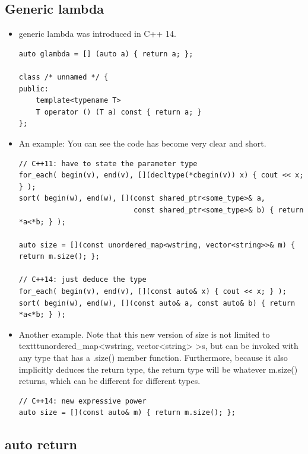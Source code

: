 \documentclass[a4paper,11pt,twoside]{book}
\begin{document}
\subsection{Generic lambda}
	
\begin{itemize}
		\item generic lambda was introduced in C++ 14. 
\begin{lstlisting}
auto glambda = [] (auto a) { return a; };

class /* unnamed */ {
public:
    template<typename T>
    T operator () (T a) const { return a; }
};
\end{lstlisting}

		\item An example: You can see the code has become very clear and short.

\begin{lstlisting}
// C++11: have to state the parameter type
for_each( begin(v), end(v), [](decltype(*cbegin(v)) x) { cout << x; } );
sort( begin(w), end(w), [](const shared_ptr<some_type>& a, 
                           const shared_ptr<some_type>& b) { return *a<*b; } );

auto size = [](const unordered_map<wstring, vector<string>>& m) { return m.size(); };

// C++14: just deduce the type
for_each( begin(v), end(v), [](const auto& x) { cout << x; } );
sort( begin(w), end(w), [](const auto& a, const auto& b) { return *a<*b; } );
\end{lstlisting}

		\item Another example.  Note that this new version of size is not limited to \/texttt{unordered\_map<wstring, vector<string> >s}, but can be invoked with any type that has a .size() member function. Furthermore, because it also implicitly deduces the return type, the return type will be whatever m.size() returns, which can be different for different types.

\begin{lstlisting}
// C++14: new expressive power
auto size = [](const auto& m) { return m.size(); };
\end{lstlisting}

\end{itemize}

\subsection{auto return}
\end{document}

